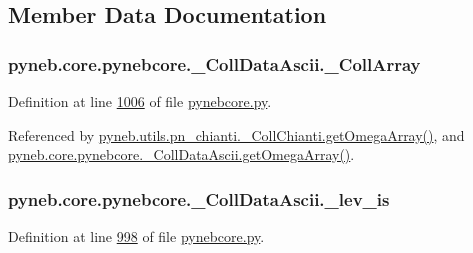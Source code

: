 \subsection{Member Data Documentation}
\hypertarget{classpyneb_1_1core_1_1pynebcore_1_1___coll_data_ascii_a01539063e6fade51b407dba1faa011c6}{
\subsubsection[{\-\_\-\-Coll\-Array}]{\setlength{\rightskip}{0pt plus 5cm}pyneb.\-core.\-pynebcore.\-\_\-\-Coll\-Data\-Ascii.\-\_\-\-Coll\-Array\hspace{0.3cm}{\ttfamily [private]}}}\label{classpyneb_1_1core_1_1pynebcore_1_1___coll_data_ascii_a01539063e6fade51b407dba1faa011c6}


Definition at line \hyperlink{pynebcore_8py_source_l01006}{1006} of file \hyperlink{pynebcore_8py_source}{pynebcore.\-py}.



Referenced by \hyperlink{pn__chianti_8py_source_l00484}{pyneb.\-utils.\-pn\-\_\-chianti.\-\_\-\-Coll\-Chianti.\-get\-Omega\-Array()}, and \hyperlink{pynebcore_8py_source_l01058}{pyneb.\-core.\-pynebcore.\-\_\-\-Coll\-Data\-Ascii.\-get\-Omega\-Array()}.

\hypertarget{classpyneb_1_1core_1_1pynebcore_1_1___coll_data_ascii_a87c7c234487963a3d9d015294637e59a}{
\subsubsection[{\-\_\-lev\-\_\-is}]{\setlength{\rightskip}{0pt plus 5cm}pyneb.\-core.\-pynebcore.\-\_\-\-Coll\-Data\-Ascii.\-\_\-lev\-\_\-is\hspace{0.3cm}{\ttfamily [private]}}}\label{classpyneb_1_1core_1_1pynebcore_1_1___coll_data_ascii_a87c7c234487963a3d9d015294637e59a}


Definition at line \hyperlink{pynebcore_8py_source_l00998}{998} of file \hyperlink{pynebcore_8py_source}{pynebcore.\-py}.

